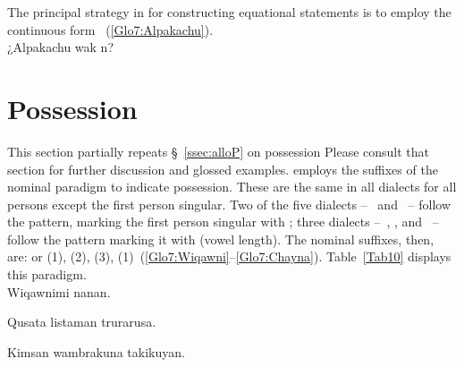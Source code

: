 \noindent
The principal strategy in \SYQ{} for constructing equational statements is to employ the continuous form ~(\ref{Glo7:Alpakachu}).\\

%
{¿Alpakachu wak n?}%
{}%
{}{}%

\section{Possession}
This section partially repeats §~\ref{ssec:alloP} on possession Please consult that section for further discussion and glossed examples. \SYQ{} employs the suffixes of the nominal paradigm to indicate possession. These are the same in all dialects for all persons except the first person singular. Two of the five dialects --~\AMV{} and \LT~-- follow the \QII{} pattern, marking the first person singular with ; three dialects --~\ACH, \CH, and \SP~-- follow the \QI{} pattern marking it with \phono{-:} (vowel length). The \SYQ{} nominal suffixes, then, are:  or \phono{-:} (1),  (2),  (3),  (1)~(\ref{Glo7:Wiqawni}--\ref{Glo7:Chayna}). Table~\ref{Tab10} displays this paradigm.\\

%
{Wiqawnimi nanan.}%
{}%
{}{}%

%
{Qusa\pb{:}ta listaman trurarusa.}%
{}%
{}{}%

%
{Kimsan wambrakuna takikuyan.}%
{}%
{}{}%


